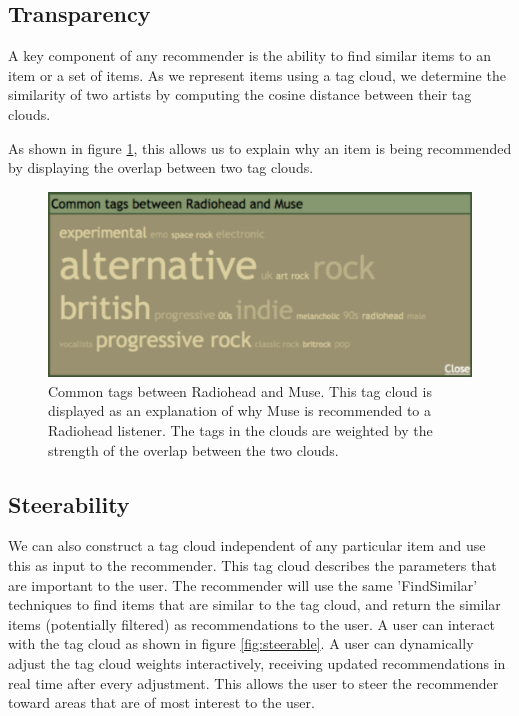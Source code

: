 \documentclass[a4paper,10pt,twocolumn]{article}
\begin{document}
\subsection{Transparency}

A key component of any recommender is the ability to 
find similar items to an item or a set of items. As we represent items using 
a tag cloud, we determine the similarity of two artists by computing the 
cosine distance between their tag clouds.

As shown in figure \ref{fig:commontags}, this allows us to explain why an item is being recommended 
by displaying the overlap between two tag clouds. 

\begin{figure}[ht]
\begin{center}
\includegraphics[width=0.9\columnwidth]{radiohead-muse-commontags}
\end{center}
\caption{Common tags between Radiohead and Muse. This tag cloud is displayed as an explanation of why Muse is recommended to a Radiohead listener. The tags in the clouds are weighted by the strength of the overlap between the two clouds.}
\label{fig:commontags}
\end{figure}

\subsection{Steerability}

We can also construct a tag cloud independent of
any particular item and use this as input to the
recommender. This tag cloud describes the
parameters that are important to the user.  The
recommender will use the same 'FindSimilar'
techniques to find items that are similar to the
tag cloud, and return the similar items
(potentially filtered) as recommendations to the
user.  A user can interact with the tag cloud as shown in figure \ref{fig:steerable}.  A
user can dynamically adjust the tag cloud
weights interactively, receiving updated
recommendations in real time after every adjustment. This
allows the user to steer the recommender toward
areas that are of most interest to the user.
\end{document}
